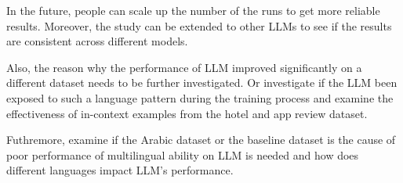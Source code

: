 \documentclass[sigconf, nonacm]{acmart}
\theoremstyle{definition}
\begin{document}
In the future, people can scale up the number of the runs to get more reliable results. Moreover, the study can be extended to other LLMs to see if the results are consistent across different models.

Also, the reason why the performance of LLM improved significantly on a different dataset needs to be further investigated. Or investigate if the LLM been exposed to such a language pattern during the training process and examine the effectiveness of in-context examples from the hotel and app review dataset.

Futhremore, examine if the Arabic dataset or the baseline dataset is the cause of poor performance of multilingual ability on LLM is needed and how does different languages impact LLM's performance.



\end{document}
